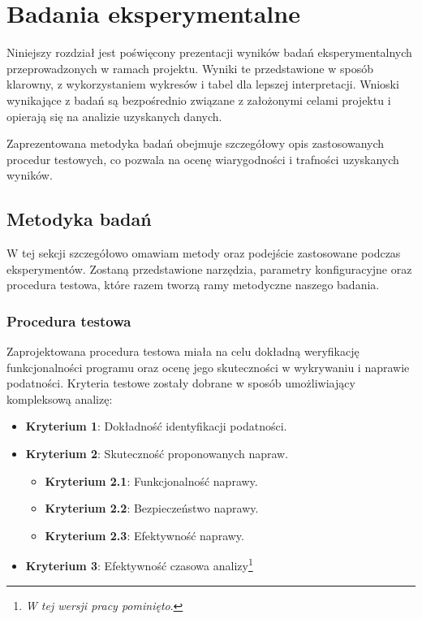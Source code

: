 \chapter{Badania eksperymentalne}

Niniejszy rozdział jest poświęcony prezentacji wyników badań eksperymentalnych przeprowadzonych w ramach projektu. Wyniki te przedstawione w sposób klarowny, z wykorzystaniem wykresów i tabel dla lepszej interpretacji. 
Wnioski wynikające z badań są bezpośrednio związane z założonymi celami projektu i opierają się na analizie uzyskanych danych.

Zaprezentowana metodyka badań obejmuje szczegółowy opis zastosowanych procedur testowych, co pozwala na ocenę wiarygodności i trafności uzyskanych wyników.

\section{Metodyka badań}

W tej sekcji szczegółowo omawiam metody oraz podejście zastosowane podczas eksperymentów. 
Zostaną przedstawione narzędzia, parametry konfiguracyjne oraz procedura testowa, które razem tworzą ramy metodyczne naszego badania.

\subsection{Procedura testowa}

Zaprojektowana procedura testowa miała na celu dokładną weryfikację funkcjonalności programu oraz ocenę jego skuteczności w wykrywaniu i naprawie podatności. Kryteria testowe zostały dobrane w sposób umożliwiający kompleksową analizę:

\begin{itemize}
    \item \textbf{Kryterium 1}: Dokładność identyfikacji podatności.
    \item \textbf{Kryterium 2}: Skuteczność proponowanych napraw.
      \begin{itemize}
        \item \textbf{Kryterium 2.1}: Funkcjonalność naprawy.
        \item \textbf{Kryterium 2.2}: Bezpieczeństwo naprawy.
        \item \textbf{Kryterium 2.3}: Efektywność naprawy.
      \end{itemize}
    \item \textbf{Kryterium 3}: Efektywność czasowa analizy\footnote{\textit{W tej wersji pracy pominięto}.}
\end{itemize}

